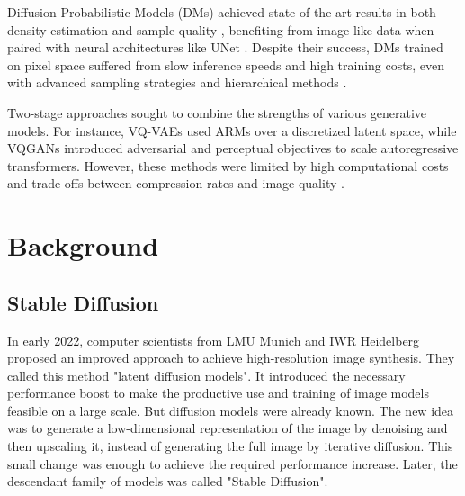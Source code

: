 \documentclass[11pt]{article}
\begin{document}
Diffusion Probabilistic Models (DMs) \cite{sohldickstein2015deepunsupervisedlearningusing} achieved state-of-the-art results in both density estimation \cite{kingma2023variationaldiffusionmodels} and sample quality \cite{dhariwal2021diffusionmodelsbeatgans}, benefiting from image-like data when paired with neural architectures like UNet \cite{dhariwal2021diffusionmodelsbeatgans, ronneberger2015unetconvolutionalnetworksbiomedical, DBLP:journals/corr/abs-2011-13456}. Despite their success, DMs trained on pixel space suffered from slow inference speeds and high training costs, even with advanced sampling strategies and hierarchical methods \cite{DBLP:journals/corr/abs-2106-15282, DBLP:journals/corr/abs-2106-00132, DBLP:journals/corr/abs-2104-02600, DBLP:conf/iclr/SongME21, DBLP:journals/corr/abs-2106-05931}.

Two-stage approaches \cite{DBLP:conf/iclr/DaiW19, esser2021tamingtransformershighresolutionimage, DBLP:conf/nips/RazaviOV19, DBLP:conf/nips/RombachEO20, DBLP:journals/corr/abs-2104-10157, yu2021vectorquantized} sought to combine the strengths of various generative models. For instance, VQ-VAEs \cite{DBLP:conf/nips/RazaviOV19, DBLP:journals/corr/abs-2104-10157} used ARMs over a discretized latent space, while VQGANs \cite{esser2021tamingtransformershighresolutionimage, yu2021vectorquantized} introduced adversarial and perceptual objectives to scale autoregressive transformers. However, these methods were limited by high computational costs and trade-offs between compression rates and image quality \cite{esser2021tamingtransformershighresolutionimage, ramesh2021zeroshottexttoimagegeneration}.





\pagebreak
\section{Background}
\subsection{Stable Diffusion}
\label{heading:subsection:stable_diffusion}
In early 2022, computer scientists from LMU Munich and IWR Heidelberg proposed an improved approach to achieve high-resolution image synthesis\cite{rombach2022stablediffusion}. They called this method "latent diffusion models". It introduced the necessary performance boost to make the productive use and training of image models feasible on a large scale. But diffusion models were already known. The new idea was to generate a low-dimensional representation of the image by denoising and then upscaling it, instead of generating the full image by iterative diffusion. This small change was enough to achieve the required performance increase. Later, the descendant family of models was called "Stable Diffusion".
\end{document}
